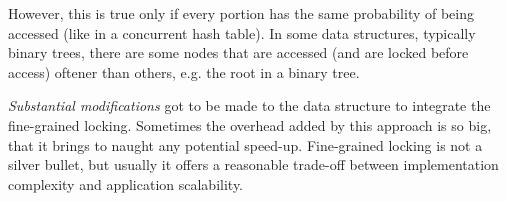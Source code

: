 However, this is true only if every portion has the same probability of being accessed (like in a concurrent hash table). In some data structures, typically binary trees, there are some nodes that are accessed (and are locked before access) oftener than others, e.g. the root in a binary tree.

\emph{Substantial modifications} got to be made to the data structure to integrate the fine-grained locking. Sometimes the overhead added by this approach is so big, that it brings to naught any potential speed-up. Fine-grained locking is not a silver bullet, but usually it offers a reasonable trade-off between implementation complexity and application scalability.
